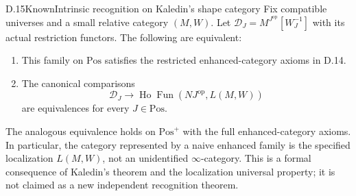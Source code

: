 \begin{result}{D.15}{Known}{Intrinsic recognition on Kaledin's shape category}
Fix compatible universes and a small relative category $(M,W)$.
Let $\mathcal D_J=M^{J^{\mathrm{op}}}[W_J^{-1}]$ with its actual
restriction functors. The following are equivalent:
\begin{enumerate}
\item This family on $\mathrm{Pos}$ satisfies the restricted
      enhanced-category axioms in D.14.
\item The canonical comparisons
\[
 \mathcal D_J\longrightarrow
 \operatorname{Ho}\operatorname{Fun}(NJ^{\mathrm{op}},L(M,W))
\]
are equivalences for every $J\in\mathrm{Pos}$.
\end{enumerate}
The analogous equivalence holds on $\mathrm{Pos}^{+}$ with the full
enhanced-category axioms. In particular, the category represented by
a naive enhanced family is the specified localization $L(M,W)$,
not an unidentified $\infty$-category. This is a formal consequence
of Kaledin's theorem and the localization universal property; it is
not claimed as a new independent recognition theorem.
\end{result}
